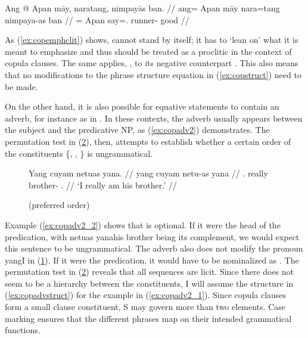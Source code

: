 \ex\label{ex:copemphclit}\ljudge*\begingl
	\gla Ang @ Apan māy, naratang, nimpayās ban. //
	\glb ang= Apan māy nara=tang nimpaya-as ban //
	\glc \Aarg{}= Apan \Int{} say=\TplM{}.\Aarg{} runner-\Parg{} good //
\endgl\xe

As (\ref{ex:copemphclit}) shows,  cannot stand by itself; it
has to `lean on' what it is meant to emphasize and thus should be treated as a
proclitic in the context of copula clauses. The same applies, , to its negative counterpart . This also means that
no modifications to the phrase structure equation in (\ref{ex:copstruct}) need
to be made.

On the other hand, it is also possible for equative statements to contain an
adverb, for instance as in . In these contexts, the
adverb usually appears between the subject and the predicative NP, as
(\ref{ex:copadv2}) demonstrates. The permutation test in (\ref{ex:copadvperm}),
then, attempts to establish whether a certain order of the constituents 
\{, , \} is ungrammatical.

\begin{figure}
\pex\label{ex:copadv2}
\a\label{ex:copadv2_1}\begingl
	\gla Yang cuyam netuas yana. //
	\glb yang cuyam netu-as yana //
	\glc \Fsg{}.\Aarg{} really brother-\Parg{} \TsgM{}.\Gen{} //
	\glft `I really am his brother.' //
\endgl

\a\label{ex:copadv2_2}%

\a\label{ex:copadv2_3}\ljudge*%

\xe
\end{figure}

\begin{figure}
\pex\label{ex:copadvperm}
\a{} (preferred order)
\a{}
\a{}
\a{}
\a{}
\a{}
\xe
\end{figure}

Example (\ref{ex:copadv2_2}) shows that  is
optional. If it were the head of the predication, with 
{netuas yana}{his brother} being its complement, we would expect this sentence
to be ungrammatical. The adverb also does not modify the pronoun 
{yang}{I} in (\ref{ex:copadv2_3}). If it were the predication, it would have to
be nominalized as . The permutation test in
(\ref{ex:copadvperm}) reveals that all sequences are licit. Since there does
not seem to be a hierarchy between the constituents, I will assume the
structure in (\ref{ex:copadvstruct}) for the example in (\ref{ex:copadv2_1}).
Since copula clauses form a small clause constituent, S may govern more than
two elements. Case marking ensures that the different phrases map on their
intended grammatical functions.

